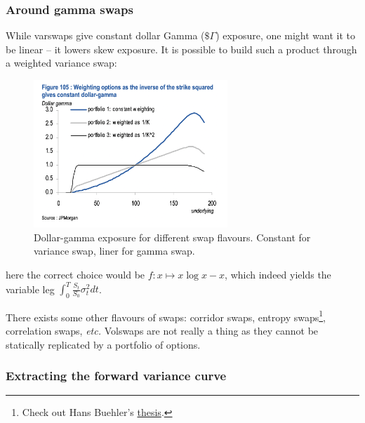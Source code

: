 \subsubsection*{Around gamma swaps}

While varswaps give constant dollar Gamma ($\$\Gamma$) exposure, one might want it to be linear -- it lowers skew exposure. It is possible to build such a product through a weighted variance swap:

\begin{figure}[H]
    \includegraphics[width=0.65\textwidth]{include/img/jpm_varswap_gamma.png}
    \centering
    \caption{Dollar-gamma exposure for different swap flavours. Constant for variance swap, liner for gamma swap.}
    \label{fig:bivariate_contour}
\end{figure}

here the correct choice would be $f: x \mapsto x\log x - x$, which indeed yields the variable leg $\int_{0}^{T} \frac{S_t}{S_0} \sigma_t^2 dt$.

There exists some other flavours of swaps: corridor swaps, entropy swaps\footnote{Check out Hans Buehler's \href{https://papers.ssrn.com/sol3/papers.cfm?abstract_id=1118245}{thesis}.}, correlation swaps, \textit{etc.} Volswaps are not really a thing as they cannot be statically replicated by a portfolio of options.

\subsubsection*{Extracting the forward variance curve}

